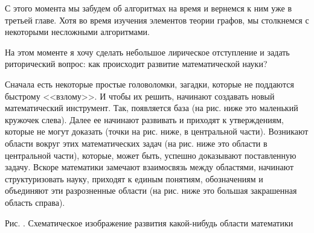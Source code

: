 	С этого момента мы забудем об алгоритмах на время и вернемся к ним уже в третьей главе. 
	Хотя во время изучения элементов теории графов, мы столкнемся с некоторыми несложными алгоритмами.
	

	На этом моменте я хочу сделать небольшое лирическое отступление и задать риторический вопрос: как происходит развитие математической науки?
	
	Сначала есть некоторые простые головоломки, загадки, которые не поддаются быстрому <<взлому>>. И чтобы их решить, 
	начинают создавать новый математический инструмент. Так, появляется база (на рис. ниже это маленький кружочек слева). 
	Далее ее начинают развивать и приходят к утверждениям, которые не могут доказать (точки на рис. ниже, в центральной части). 
	Возникают области вокруг этих математических задач (на рис. ниже это области в центральной части), которые, может быть, успешно 
	доказывают поставленную задачу. Вскоре математики замечают взаимосвязь между областями, начинают структуризовать науку, 
	приходят к единым понятиям, обозначениям и объединяют эти разрозненные области (на рис. ниже это большая закрашенная область справа).

\begin{center}

	\small Рис. \images. Схематическое изображение развития какой-нибудь области математики
\end{center}

